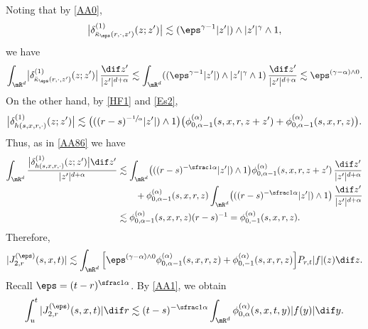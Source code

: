 Noting that by \eqref{AA0},\vspace*{-3pt}
\[
\bigl|\delta^{(1)}_{\bar\kappa_\eps(r,\cdot,z')}(z;z')\bigr|\lesssim (\eps^{\gamma-1}|z'|)\wedge|z'|^\gamma\wedge 1,
\]
we have
\begin{equation*}
\int_{\mR^d}\bigl|\delta^{(1)}_{\bar\kappa_\eps(r,\cdot,z')}(z;z')\bigr|\,\frac{\dif z'}{|z'|^{d+\alpha}}\lesssim
\int_{\mR^d}((\eps^{\gamma-1}|z'|)\wedge|z'|^\gamma\wedge 1)\,\frac{\dif z'}{|z'|^{d+\alpha}}\lesssim\eps^{(\gamma-\alpha)\wedge 0}.
\end{equation*}
On the other hand, by \eqref{HF1} and \eqref{Es2},
\begin{equation*}
\bigl|\delta^{(1)}_{h(s,x,r,\cdot)}(z;z')\bigr|\lesssim \bigl(((r-s)^{-\sfrac1\alpha}|z'|)\wedge 1\bigr)
\bigl(\phi^{(\alpha)}_{0,\alpha-1}(s,x,r,z+z')+\phi^{(\alpha)}_{0,\alpha-1}(s,x,r,z)\bigr).
\end{equation*}
Thus, as in \eqref{AA86} we have\vspace*{-3pt}
\begin{align*}
\int_{\mR^d}\frac{\bigl|\delta^{(1)}_{h(s,x,r,\cdot)}(z;z')\bigr|\dif z'}{|z'|^{d+\alpha}}
&\lesssim \int_{\mR^d}\bigl(((r-s)^{-\sfrac1\alpha}|z'|)\wedge 1\bigr)\phi^{(\alpha)}_{0,\alpha-1}(s,x,r,z+z')\,\frac{\dif z'}{|z'|^{d+\alpha}}\\
&\hspace*{.7cm}+\phi^{(\alpha)}_{0,\alpha-1}(s,x,r,z)\int_{\mR^d}\bigl(((r-s)^{-\sfrac1\alpha}|z'|)\wedge 1\bigr)\,\frac{\dif z'}{|z'|^{d+\alpha}}\\
&\lesssim \phi^{(\alpha)}_{0,\alpha-1}(s,x,r,z)(r-s)^{-1}=\phi^{(\alpha)}_{0,-1}(s,x,r,z).
\end{align*}
Therefore,\vspace*{-3pt}
\begin{equation*}
|J^{(\eps)}_{2,r}(s,x,t)|
\lesssim \int_{\mR^d}\Big[\eps^{
(\gamma-\alpha)\wedge 0
}\phi^{(\alpha)}_{0,\alpha-1}(s,x,r,z)
+\phi^{(\alpha)}_{0,-1}(s,x,r,z)\Big]P_{r,t}|f|(z)\dif z.
\end{equation*}
Recall $\eps=(t-r)^{\sfrac1\alpha}$. By \eqref{AA1}, we obtain\vspace*{-3pt}
\[
\int_{u}^t |J^{(\eps)}_{2,r}(s,x,t)|\dif r\lesssim(t-s)^{-\sfrac1\alpha}\int_{\mR^d}\phi^{(\alpha)}_{0,\alpha}(s,x,t,y)|f(y)|\dif y.
\]

